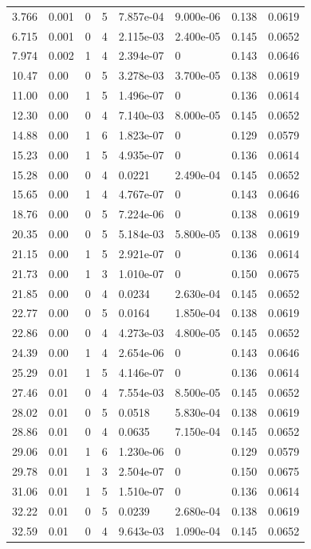\documentclass[preview]{standalone}
\begin{document}
{{\begin{tabular}{L{1.2cm}C{1.2cm} C{0.3cm}C{0.5cm} C{1.4cm}C{1.4cm} C{1.4cm}C{1.4cm}}
  3.766  &  0.001  & 0     &  5 &  7.857e-04  & 9.000e-06  & 0.138 &  0.0619   \\ 
  6.715  &  0.001  & 0     &  4 &  2.115e-03  & 2.400e-05  & 0.145 &  0.0652   \\ 
  7.974  &  0.002  & 1     &  4 &  2.394e-07  & 0  & 0.143 &  0.0646   \\ 
  10.47  &  0.00  & 0     &  5 &  3.278e-03  & 3.700e-05  & 0.138 &  0.0619   \\ 
  11.00  &  0.00  & 1     &  5 &  1.496e-07  & 0  & 0.136 &  0.0614   \\ 
  12.30  &  0.00  & 0     &  4 &  7.140e-03  & 8.000e-05  & 0.145 &  0.0652   \\ 
  14.88  &  0.00  & 1     &  6 &  1.823e-07  & 0  & 0.129 &  0.0579   \\ 
  15.23  &  0.00  & 1     &  5 &  4.935e-07  & 0  & 0.136 &  0.0614   \\ 
  15.28  &  0.00  & 0     &  4 &  0.0221  & 2.490e-04  & 0.145 &  0.0652   \\ 
  15.65  &  0.00  & 1     &  4 &  4.767e-07  & 0  & 0.143 &  0.0646   \\ 
  18.76  &  0.00  & 0     &  5 &  7.224e-06  & 0  & 0.138 &  0.0619   \\ 
  20.35  &  0.00  & 0     &  5 &  5.184e-03  & 5.800e-05  & 0.138 &  0.0619   \\ 
  21.15  &  0.00  & 1     &  5 &  2.921e-07  & 0  & 0.136 &  0.0614   \\ 
  21.73  &  0.00  & 1     &  3 &  1.010e-07  & 0  & 0.150 &  0.0675   \\ 
  21.85  &  0.00  & 0     &  4 &  0.0234  & 2.630e-04  & 0.145 &  0.0652   \\ 
  22.77  &  0.00  & 0     &  5 &  0.0164  & 1.850e-04  & 0.138 &  0.0619   \\ 
  22.86  &  0.00  & 0     &  4 &  4.273e-03  & 4.800e-05  & 0.145 &  0.0652   \\ 
  24.39  &  0.00  & 1     &  4 &  2.654e-06  & 0  & 0.143 &  0.0646   \\ 
  25.29  &  0.01  & 1     &  5 &  4.146e-07  & 0  & 0.136 &  0.0614   \\ 
  27.46  &  0.01  & 0     &  4 &  7.554e-03  & 8.500e-05  & 0.145 &  0.0652   \\ 
  28.02  &  0.01  & 0     &  5 &  0.0518  & 5.830e-04  & 0.138 &  0.0619   \\ 
  28.86  &  0.01  & 0     &  4 &  0.0635  & 7.150e-04  & 0.145 &  0.0652   \\ 
  29.06  &  0.01  & 1     &  6 &  1.230e-06  & 0  & 0.129 &  0.0579   \\ 
  29.78  &  0.01  & 1     &  3 &  2.504e-07  & 0  & 0.150 &  0.0675   \\ 
  31.06  &  0.01  & 1     &  5 &  1.510e-07  & 0  & 0.136 &  0.0614   \\ 
  32.22  &  0.01  & 0     &  5 &  0.0239  & 2.680e-04  & 0.138 &  0.0619   \\ 
  32.59  &  0.01  & 0     &  4 &  9.643e-03  & 1.090e-04  & 0.145 &  0.0652   \\ 
\hline 
\end{tabular} 

}}
\end{document}
